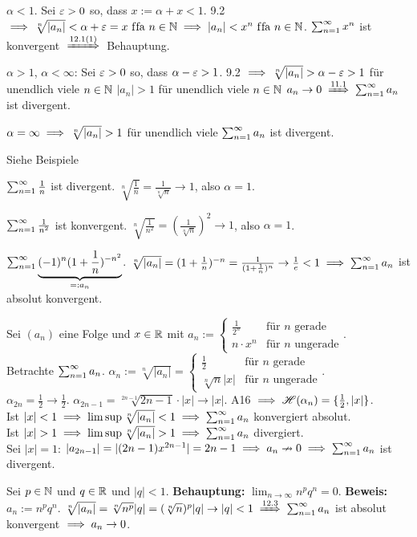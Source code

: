 \documentclass[a4paper,twoside,DIV15,BCOR12mm]{scrbook}
\begin{document}
\begin{beweise}
\item $\alpha < 1 $. Sei $\varepsilon>0$ so, dass $x:= \alpha+x<1$. 9.2 $\implies \sqrt[n]{|a_n|} < \alpha + \varepsilon = x \text{ f\/fa } n\in\mathbb{N} \implies |a_n| < x^n \text{ f\/fa } n\in\mathbb{N}$. $\sum_{n=1}^{\infty}{x^n}$ ist konvergent $\folgtnach{12.1(1)}$ Behauptung.
\item 
 \begin{liste}
 \item $\alpha>1$, $\alpha<\infty$: Sei $\varepsilon>0$ so, dass $\alpha-\varepsilon>1$. 9.2 $\implies \sqrt[n]{|a_n|}>\alpha-\varepsilon>1$ für unendlich viele $n\in\mathbb{N}$ \folgt $|a_n|>1$ für unendlich viele $n\in\mathbb{N}$ \folgt $a_n \to 0 \folgtnach{11.1} \reihe{a_n}$ ist divergent.
 \item $\alpha = \infty \implies \sqrt[n]{|a_n|} > 1$ für unendlich viele \natn {} $\sum_{n=1}^{\infty}{a_n}$ ist divergent.
 \end{liste}
\item Siehe Beispiele
\end{beweise}

\begin{beispiele}
\item $\sum_{n=1}^{\infty}{\frac{1}{n}}$ ist divergent. $\sqrt[n]{\frac{1}{n}} = \frac{1}{\sqrt[n]{n}} \to 1$, also $\alpha = 1$.
\item $\sum_{n=1}^{\infty}{\frac{1}{n^2}}$ ist konvergent. $\sqrt[n]{\frac{1}{n^2}} = (\frac{1}{\sqrt[n]{n}})^2 \to 1$, also $\alpha = 1$.
\item $\sum_{n=1}^{\infty}{\underbrace{(-1)^{n}(1+\frac{1}{n})^{-n^2}}_{=:a_n}}$. $\sqrt[n]{|a_n|} = (1+\frac{1}{n})^{-n} = \frac{1}{(1+\frac{1}{n})^n} \to \frac{1}{e} < 1 \implies \sum_{n=1}^{\infty}{a_n}$ ist absolut konvergent.
\item Sei $(a_n)$ eine Folge und $x\in\mathbb{R}$ mit $a_n:= \begin{cases}\frac{1}{2^n} & \text{für }n\text{ gerade} \\ n\cdot x^n & \text{für }n\text{ ungerade}\end{cases}$. \\
Betrachte $\sum_{n=1}^{\infty}{a_n}$. $\alpha_n := \sqrt[n]{|a_n|} = \begin{cases}\frac{1}{2} &\text{für }n\text{ gerade} \\ \sqrt[n]{n}|x| &\text{für }n\text{ ungerade}\end{cases}$. \\
$\alpha_{2n} = \frac{1}{2} \to \frac{1}{2}$. $\alpha_{2n-1} = \sqrt[2n-1]{2n-1}\cdot|x| \to |x|$. A16 $\implies \mathscr{H}(\alpha_n) = \{\frac{1}{2}, |x|\}$. \\
Ist $|x| < 1 \implies \limsup \sqrt[n]{|a_n|} < 1 \implies \sum_{n=1}^{\infty}{a_n}$ konvergiert absolut.\\
Ist $|x| > 1 \implies \limsup \sqrt[n]{|a_n|} > 1 \implies \sum_{n=1}^{\infty}{a_n}$ divergiert.\\
Sei $|x|=1$: $|a_{2n-1}| = | (2n-1)x^{2n-1}| = 2n-1 \implies a_n \nrightarrow 0 \implies \sum_{n=1}^{\infty}{a_n}$ ist divergent.
\item Sei $p\in\mathbb{N}$ und $q\in\mathbb{R}$ und $|q|<1$. \textbf{Behauptung:} $\lim_{n\to\infty} n^pq^n=0$. \textbf{Beweis:} $a_n := n^pq^n$. $\sqrt[n]{|a_n|} = \sqrt[n]{n^p}|q| = (\sqrt[n]{n})^p|q| \to |q|<1 \folgtnach{12.3} \reihe{a_n}$ ist absolut konvergent $\implies a_n \to 0$.
\end{beispiele}
\end{document}
